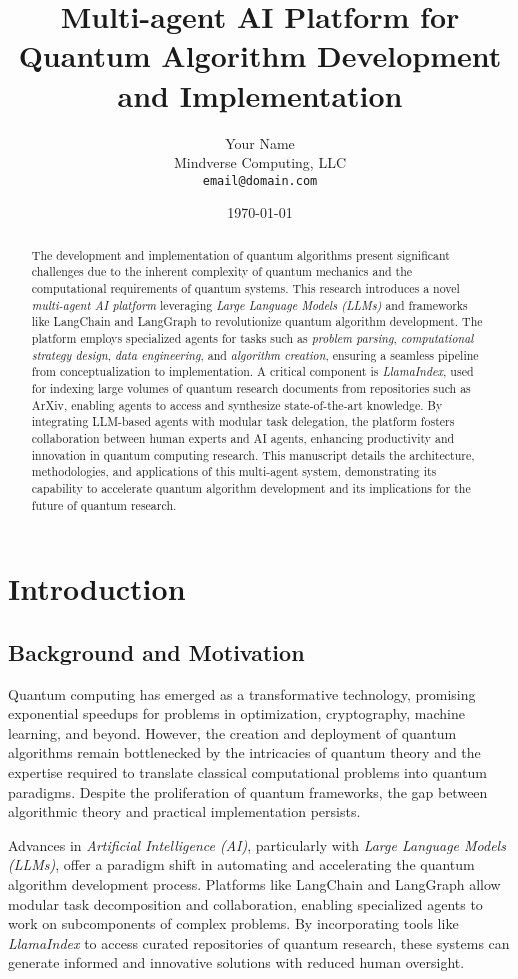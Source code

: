 \documentclass[12pt]{article}
\title{Multi-agent AI Platform for Quantum Algorithm Development and Implementation}
\author{Your Name \\
\small Mindverse Computing, LLC \\
\small \texttt{email@domain.com}}
\date{\today}
\begin{document}
\maketitle

\begin{abstract}
The development and implementation of quantum algorithms present significant challenges due to the inherent complexity of quantum mechanics and the computational requirements of quantum systems. This research introduces a novel \textit{multi-agent AI platform} leveraging \textit{Large Language Models (LLMs)} and frameworks like LangChain and LangGraph to revolutionize quantum algorithm development. The platform employs specialized agents for tasks such as \textit{problem parsing}, \textit{computational strategy design}, \textit{data engineering}, and \textit{algorithm creation}, ensuring a seamless pipeline from conceptualization to implementation. A critical component is \textit{LlamaIndex}, used for indexing large volumes of quantum research documents from repositories such as ArXiv, enabling agents to access and synthesize state-of-the-art knowledge. By integrating LLM-based agents with modular task delegation, the platform fosters collaboration between human experts and AI agents, enhancing productivity and innovation in quantum computing research. This manuscript details the architecture, methodologies, and applications of this multi-agent system, demonstrating its capability to accelerate quantum algorithm development and its implications for the future of quantum research.
\end{abstract}

\section{Introduction}
\subsection{Background and Motivation}
Quantum computing has emerged as a transformative technology, promising exponential speedups for problems in optimization, cryptography, machine learning, and beyond. However, the creation and deployment of quantum algorithms remain bottlenecked by the intricacies of quantum theory and the expertise required to translate classical computational problems into quantum paradigms. Despite the proliferation of quantum frameworks, the gap between algorithmic theory and practical implementation persists.

Advances in \textit{Artificial Intelligence (AI)}, particularly with \textit{Large Language Models (LLMs)}, offer a paradigm shift in automating and accelerating the quantum algorithm development process. Platforms like LangChain and LangGraph allow modular task decomposition and collaboration, enabling specialized agents to work on subcomponents of complex problems. By incorporating tools like \textit{LlamaIndex} to access curated repositories of quantum research, these systems can generate informed and innovative solutions with reduced human oversight.
\end{document}
